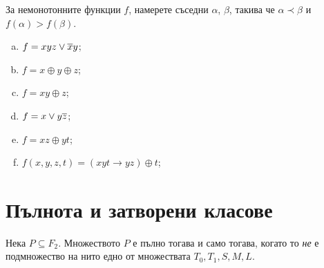 \begin{problem}
  За немонотонните функции $f$, намерете съседни $\alpha$, $\beta$, такива че
  $\alpha \prec \beta$ и $f(\alpha) > f(\beta)$.
  \begin{enumerate}[a)]
  \item
    $f = xyz \vee \overline{x}y$;
  \item
    $f = x\oplus y\oplus z$;
  \item
    $f = xy\oplus z$;
  \item
    $f = x\vee y\overline{z}$;
  \item
    $f = xz\oplus yt$;
  \item
    $f(x,y,z,t) = (xyt\rightarrow yz)\oplus t$;
  \end{enumerate}
\end{problem}


\section{Пълнота и затворени класове}

\begin{thm}
  Нека $P\subseteq F_2$. Множеството $P$ е пълно тогава и само тогава, когато то {\em не} е подмножество на 
  нито едно от множествата $T_0,T_1,S,M,L$.
\end{thm}


